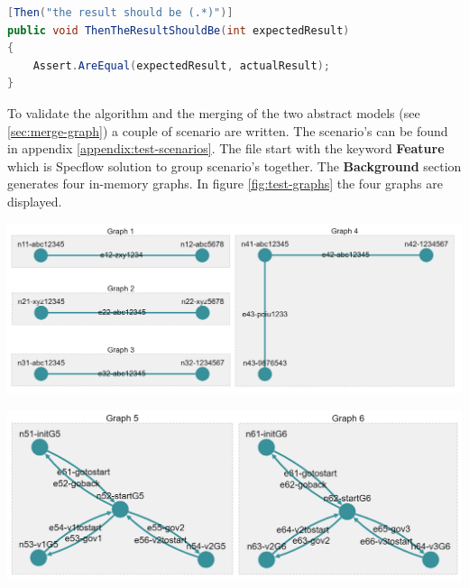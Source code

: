 \begin{lstlisting}[language=Java, caption=Implementation of a 'then' line, label=code:gherkin-example-code]
[Then("the result should be (.*)")]
public void ThenTheResultShouldBe(int expectedResult)
{
    Assert.AreEqual(expectedResult, actualResult);
}
\end{lstlisting}

To validate the algorithm and the merging of the two abstract models (see \ref{sec:merge-graph}) a couple of scenario are written. The scenario's can be found in appendix \ref{appendix:test-scenarios}. The file start with the keyword \textbf{Feature} which is Specflow solution to group scenario's together. The \textbf{Background} section generates four in-memory graphs. In figure \ref{fig:test-graphs} the four graphs are displayed. 

\begingroup
\captionsetup{type=figure}
\includegraphics[scale=0.6]{images/6-TestGraphs.png}
\label{fig:test-graphs}
\endgroup

\begingroup
\captionsetup{type=figure}
\includegraphics[scale=0.5]{images/6-test-graph-5-6.png}
\label{fig:test-graphs}
\endgroup